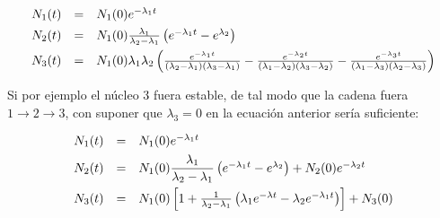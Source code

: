 \begin{equation}
	\begin{array}{ccl} \vspace{1.5mm}
		N_1(t) & = & N_1(0) e^{-\lambda_1 t}\\ \vspace{1.5mm} 
		N_2(t) & = & N_1(0) \frac{\lambda_1}{\lambda_2 - \lambda_1} \parentesis{e^{-\lambda_1 t } - e^{\lambda_2}} \\\vspace{1.5mm}
		N_3(t) & = & N_1(0) \lambda_1 \lambda_2 \parentesis{ \frac{e^{-\lambda_1 t }}{(\lambda_2-\lambda_1)(\lambda_3-\lambda_1)}  -\frac{e^{-\lambda_2 t }}{(\lambda_1-\lambda_2)(\lambda_3-\lambda_2)} -\frac{e^{-\lambda_3 t }}{(\lambda_1-\lambda_3)(\lambda_2-\lambda_3)} }
	\end{array}
\end{equation}
Si por ejemplo el núcleo 3 fuera estable, de tal modo que la cadena fuera $1\rightarrow 2\rightarrow 3$, con suponer que $\lambda_3=0$ en la ecuación anterior sería suficiente:

\begin{equation}
	\begin{array}{ccl} \vspace{1.5mm}
		N_1(t) & = & N_1(0) e^{-\lambda_1 t}\\ \vspace{1.5mm} 
		N_2(t) & = & N_1(0) \dfrac{\lambda_1}{\lambda_2 - \lambda_1} \parentesis{e^{-\lambda_1 t } - e^{\lambda_2}} + N_2(0)e^{-\lambda_2 t} \\\vspace{3mm}
		N_3(t) & = & N_1(0)  \ccorchetes{1 + \frac{1}{\lambda_2-\lambda_1} \parentesis{\lambda_1 e^{-\lambda t} - \lambda_2 e^{-\lambda_1 t}} } + N_3 (0)
	\end{array}
\end{equation}





